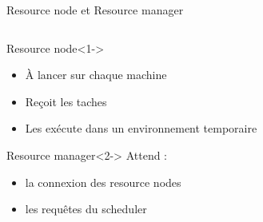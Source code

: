 \documentclass{beamer}
\begin{document}
\begin{frame}{Resource node et Resource manager}
\begin{columns}
\begin{column}[r]{0.5\linewidth}
        \begin{block}{Resource node}<1->
            \begin{itemize}
                \item À lancer sur chaque machine
                \item Reçoit les taches
                \item Les exécute dans un environnement temporaire
            \end{itemize}
        \end{block}
        \begin{block}{Resource manager}<2->
             Attend :
             \begin{itemize}
                     \item la connexion des resource nodes
                     \item les requêtes du scheduler
             \end{itemize}
        \end{block}
	\end{column}
	\end{columns}
\end{frame}
\end{document}
